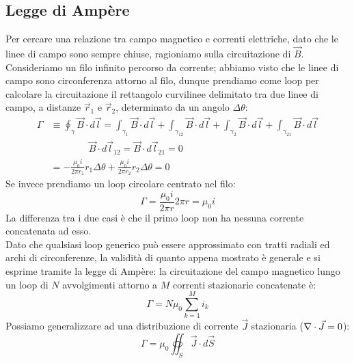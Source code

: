 \subsection{Legge di Ampère}

Per cercare una relazione tra campo magnetico e correnti elettriche, dato che le linee di campo sono sempre chiuse, ragioniamo sulla circuitazione di $ \vec{B} $. \\ 
%
Consideriamo un filo infinito percorso da corrente; abbiamo visto che le linee di campo sono circonferenza attorno al filo, dunque prendiamo come loop per calcolare la circuitazione il rettangolo curvilinee delimitato tra due linee di campo, a distanze $ \vec{r}_1 $ e $ \vec{r}_2 $, determinato da un angolo $ \Delta\theta $:
\begin{equation}
	\begin{split}
		\Gamma &\equiv \oint_{\gamma} \vec{B} \cdot d\vec{l} = \int_{\gamma_1} \vec{B} \cdot d\vec{l} + \int_{\gamma_{12}} \vec{B} \cdot d\vec{l} + \int_{\gamma_2} \vec{B} \cdot d\vec{l} + \int_{\gamma_{21}} \vec{B} \cdot d\vec{l} \\ 
		       & \qquad\qquad \vec{B}\cdot d\vec{l}_{12} = \vec{B}\cdot d\vec{l}_{21} = 0 \\ 
		       &= - \displaystyle\frac{\mu_0 i}{2\pi r_1} r_1 \Delta\theta + \displaystyle\frac{\mu_0 i}{2\pi r_2} r_2 \Delta\theta = 0
	\end{split}
	\label{eq:circ-1-filo-inf}
\end{equation}
Se invece prendiamo un loop circolare centrato nel filo:
\begin{equation}
	\Gamma = \displaystyle\frac{\mu_0 i}{2\pi r} 2\pi r = \mu_0 i
	\label{eq:circ-2-filo-inf}
\end{equation}
La differenza tra i due casi è che il primo loop non ha nessuna corrente concatenata ad esso. \\ 
%
Dato che qualsiasi loop generico può essere approssimato con tratti radiali ed archi di circonferenze, la validità di quanto appena mostrato è generale e si esprime tramite la legge di Ampère: la circuitazione del campo magnetico lungo un loop di $ N $ avvolgimenti attorno a $ M $ correnti stazionarie concatenate è:
\begin{equation}
	\Gamma = N \mu_0 \displaystyle\sum_{k = 1}^{M} i_k
	\label{eq:ampere}
\end{equation}
Possiamo generalizzare ad una distribuzione di corrente $ \vec{J} $ stazionaria ($ \nabla\cdot\vec{J} = 0 $):
\begin{equation}
	\Gamma = \mu_0 \oiint_S \vec{J} \cdot d\vec{S}
	\label{eq:ampere-int}
\end{equation}
